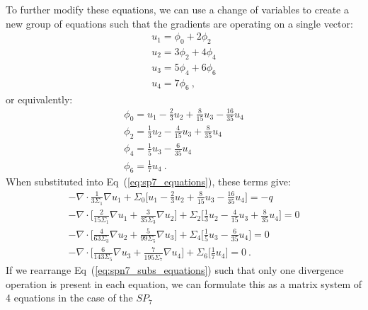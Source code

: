 To further modify these equations, we can use a change of variables to
create a new group of equations such that the gradients are operating
on a single vector:
\begin{subequations}
  \begin{gather}
    u_1 = \phi_0 + 2\phi_2 \\
    u_2 = 3\phi_2 + 4\phi_4 \\
    u_3 = 5\phi_4 + 6\phi_6 \\
    u_4 = 7\phi_6 \:,
  \end{gather}
  \label{eq:spn7_subs}
\end{subequations}
or equivalently:
\begin{subequations}
  \begin{gather}
    \phi_0 = u_1 - \frac{2}{3}u_2 + \frac{8}{15}u_3 -
    \frac{16}{35}u_4 \\
    \phi_2 = \frac{1}{3}u_2 - \frac{4}{15}u_3 + \frac{8}{35}u_4\\ 
    \phi_4 = \frac{1}{5}u_3 - \frac{6}{35}u_4\\
    \phi_6 = \frac{1}{7}u_4\:.
  \end{gather}
  \label{eq:spn7_subs_inverse}
\end{subequations}
When substituted into Eq~(\ref{eq:sp7_equations}), these terms give:
\begin{subequations}
  \begin{gather}
    -\nabla \cdot \frac{1}{3 \Sigma_1} \nabla u_1 + \Sigma_0 \Bigg[
    u_1 - \frac{2}{3}u_2 + \frac{8}{15}u_3 - \frac{16}{35}u_4 \Bigg]
    = -q \\
    -\nabla \cdot \Bigg[ \frac{2}{15 \Sigma_1} \nabla u_1 +
    \frac{3}{35 \Sigma_3} \nabla u_2 \Bigg] + \Sigma_2 \Bigg[
    \frac{1}{3}u_2 - \frac{4}{15}u_3 + \frac{8}{35}u_4 \Bigg] = 0 \\
    -\nabla \cdot \Bigg[ \frac{4}{63 \Sigma_3} \nabla u_2 +
    \frac{5}{99 \Sigma_5} \nabla u_3 \Bigg] + \Sigma_4 \Bigg[
    \frac{1}{5}u_3 - \frac{6}{35}u_4 \Bigg] = 0 \\ 
    -\nabla \cdot \Bigg[ \frac{6}{143 \Sigma_5} \nabla u_3 +
    \frac{7}{195 \Sigma_7} \nabla u_4 \Bigg] + \Sigma_6 \Bigg[
    \frac{1}{7}u_4 \Bigg] = 0 \:.
  \end{gather}
  \label{eq:spn7_subs_equations}
\end{subequations}
If we rearrange Eq~(\ref{eq:spn7_subs_equations}) such that only one
divergence operation is present in each equation, we can formulate
this as a matrix system of 4 equations in the case of the $SP_7$
